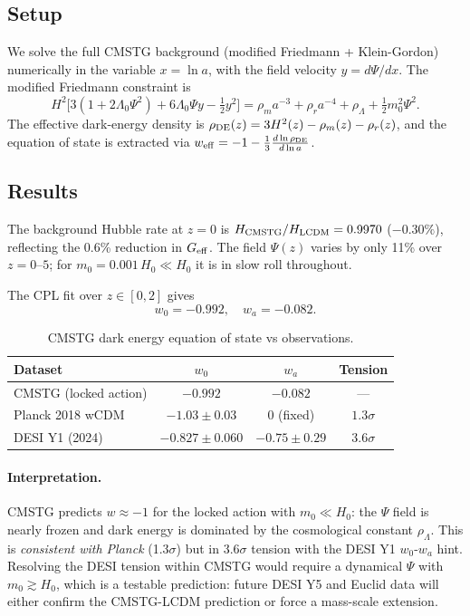 \documentclass[12pt,a4paper]{article}
\begin{document}
\subsection{Setup}

We solve the full CMSTG background (modified Friedmann + Klein-Gordon)
numerically in the variable $x=\ln a$, with the field velocity
$y=d\Psi/dx$.  The modified Friedmann constraint is
\begin{equation}
  H^2\bigl[3(1+2\Lambda_0\Psi^2) + 6\Lambda_0\Psi y - \tfrac{1}{2}y^2\bigr]
  = \rho_m a^{-3} + \rho_r a^{-4} + \rho_\Lambda + \tfrac{1}{2}m_0^2\Psi^2 .
\end{equation}
The effective dark-energy density is $\rho_{\rm DE}(z) = 3H^2(z) - \rho_m(z) - \rho_r(z)$,
and the equation of state is extracted via
$w_{\rm eff} = -1 - \frac{1}{3}\frac{d\ln\rho_{\rm DE}}{d\ln a}$.

\subsection{Results}

The background Hubble rate at $z=0$ is $H_{\rm CMSTG}/H_{\rm LCDM}=0.9970$
($-0.30\%$), reflecting the 0.6\% reduction in $G_{\rm eff}$.
The field $\Psi(z)$ varies by only 11\% over $z=0$--$5$; for
$m_0=0.001\,H_0\ll H_0$ it is in slow roll throughout.

The CPL fit over $z\in[0,2]$ gives
\begin{equation}
  w_0 = -0.992,\quad w_a = -0.082 .
\end{equation}

\begin{table}[h]
\centering
\caption{CMSTG dark energy equation of state vs observations.}
\begin{tabular}{lccc}
\hline
Dataset & $w_0$ & $w_a$ & Tension \\
\hline
CMSTG (locked action) & $-0.992$ & $-0.082$ & --- \\
Planck 2018 wCDM     & $-1.03\pm0.03$ & $0$ (fixed) & $1.3\sigma$ \\
DESI Y1 (2024)       & $-0.827\pm0.060$ & $-0.75\pm0.29$ & $3.6\sigma$ \\
\hline
\end{tabular}
\label{tab:wde}
\end{table}

\paragraph{Interpretation.}
CMSTG predicts $w\approx-1$ for the locked action with $m_0\ll H_0$:
the $\Psi$ field is nearly frozen and dark energy is dominated by the
cosmological constant $\rho_\Lambda$.  This is \emph{consistent with
Planck} (1.3$\sigma$) but in 3.6$\sigma$ tension with the DESI Y1
$w_0$-$w_a$ hint.  Resolving the DESI tension within CMSTG would require
a dynamical $\Psi$ with $m_0\gtrsim H_0$, which is a testable
prediction: future DESI Y5 and Euclid data will either confirm the
CMSTG-LCDM prediction or force a mass-scale extension.
\end{document}
